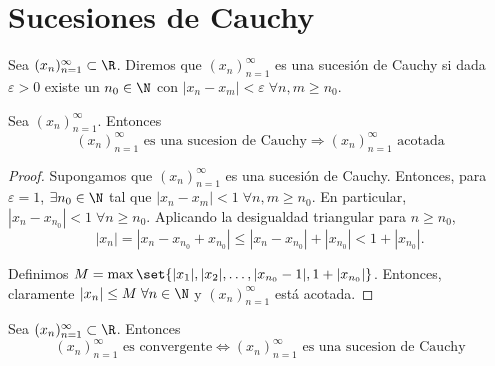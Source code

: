 \section{Sucesiones de Cauchy}
\begin{definition}
	Sea \((x_n)^{\infty}_{n=1} \subset \R\). Diremos que \((x_n)^{\infty}_{n=1} \) es una sucesión de Cauchy si dada \(\varepsilon > 0 \) existe un \(n_0 \in \N \) con \(|x_n - x_m | < \varepsilon \; \forall n, m \geq n_0 \).
\end{definition}
\begin{proposition}
	\label{cauchyac}
	Sea \((x_n)^{\infty}_{n=1} \). Entonces
	\[
		(x_n)^{\infty}_{n=1} \text{ es una sucesion de Cauchy} \Rightarrow (x_n)^{\infty}_{n=1} \text{ acotada}
	\]
\end{proposition}
\begin{proof}
	Supongamos que \((x_n)^{\infty}_{n=1}\) es una sucesión de Cauchy. Entonces, para \(\varepsilon = 1 \), \(\exists n_0 \in \N\) tal que \(\left\vert x_n - x_m  \right\vert < 1 \; \forall n,m \geq n_0\). En particular, \(\left\vert x_n - x_{n_0 } \right\vert < 1\; \forall n \geq n_0\). Aplicando la desigualdad triangular para \(n \geq n_0\),
	\[
		\left\vert x_n  \right\vert = \left\vert x_n - x_{n_0} + x_{n_0} \right\vert \leq \left\vert x_n - x_{n_0} \right\vert + \left\vert x_{n_0} \right\vert < 1 + \left\vert x_{n_0} \right\vert.
	\]

	Definimos \(M = \max\set{|x_1|, |x_2|, \ldots, |x_{n_0} - 1|, 1 + \left\vert x_{n_0} \right\vert }\). Entonces, claramente \(|x_n| \leq M \; \forall n \in \N \) y \((x_n)^{\infty}_{n=1}\) está acotada.
\end{proof}
\begin{theorem}
	Sea \((x_n)^{\infty}_{n=1} \subset \R \). Entonces
	\[
		(x_n)^{\infty}_{n=1} \text{ es convergente} \iff (x_n)^{\infty}_{n=1} \text{ es una sucesion de Cauchy}
	\]
\end{theorem}
